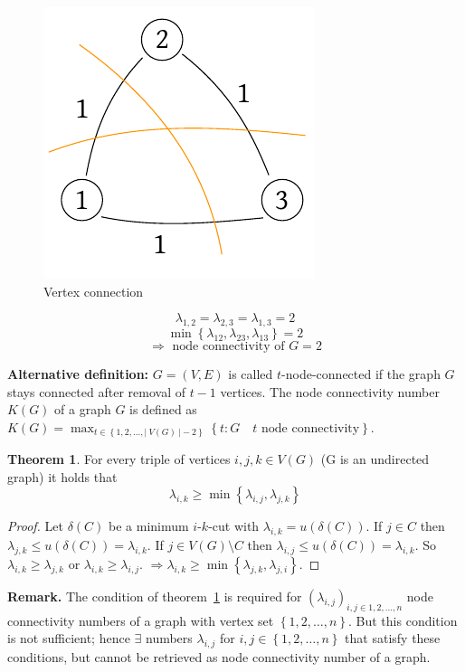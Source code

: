 \documentclass[a4paper]{article}
\theoremstyle{definition}
\newtheorem{theorem}{Theorem}
\newcommand{\card}[1]{\left|\:\!#1\:\!\right|}
\newcommand{\set}[1]{\left\{#1\right\}}
\begin{document}
\begin{figure}[ht]
 \begin{center}
  \includegraphics{img/vertex_connection.pdf}
  \caption{Vertex connection}
 \end{center}
\end{figure}
\[
  \lambda_{1,2} = \lambda_{2,3} = \lambda_{1,3} = 2
\] \[
  \min{\set{\lambda_{12}, \lambda_{23}, \lambda_{13}}} = 2
\] \[
  \Rightarrow \text{ node connectivity of } G = 2
\]

\textbf{Alternative definition:}
  $G = (V, E)$ is called $t$-node-connected if the graph $G$ stays connected after removal of $t-1$ vertices. The node connectivity number $K(G)$ of a graph $G$ is defined as $K(G) = \max_{t \in \set{1, 2, \ldots, \card{V(G)} - 2}} \set{t: G \quad t \text{ node connectivity}}$.

\begin{theorem}\label{lemma-4.5}
  For every triple of vertices $i, j, k \in V(G)$ (G is an undirected graph) it holds that
  \[
    \lambda_{i,k} \geq \min{\set{\lambda_{i,j}, \lambda_{j,k}}}
  \]
\end{theorem}

\begin{proof}
  Let $\delta(C)$ be a minimum $i$-$k$-cut with $\lambda_{i,k} = u(\delta(C))$.
  If $j \in C$ then $\lambda_{j,k} \leq u(\delta(C)) = \lambda_{i,k}$.
  If $j \in V(G) \setminus C$ then $\lambda_{i,j} \leq u(\delta(C)) = \lambda_{i,k}$.
  So $\lambda_{i,k} \geq \lambda_{j,k}$ or $\lambda_{i,k} \geq \lambda_{i,j}$.
  $\Rightarrow \lambda_{i,k} \geq \min{\set{\lambda_{j,k}, \lambda_{j,i}}}$.
\end{proof}

\textbf{Remark.}
  The condition of theorem~\ref{lemma-4.5} is required for $(\lambda_{i,j})_{i,j \in 1, 2, \ldots, n}$ node connectivity numbers of a graph with vertex set $\set{1, 2, \ldots, n}$.
  But this condition is not sufficient; hence $\exists$ numbers $\lambda_{i,j}$ for $i,j \in \set{1, 2, \ldots, n}$ that satisfy these conditions, but cannot be retrieved as node connectivity number of a graph.
\end{document}
